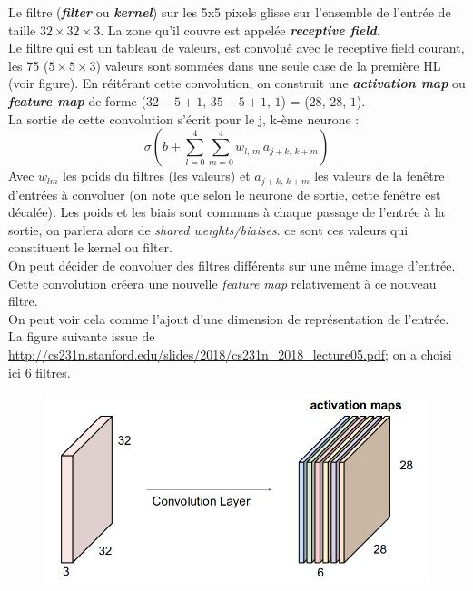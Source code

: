\documentclass[a4paper,12pt]{report}
\numberwithin{equation}{section} %
\begin{document}
Le filtre (\textit{\textbf{filter}} ou \textit{\textbf{kernel}}) sur les 5x5 pixels glisse sur l'ensemble de l'entrée de taille $32\times32\times3$. La zone qu'il couvre est appelée \textbf{\textit{receptive field}}. \\
Le filtre qui est un tableau de valeurs, est convolué avec le receptive field courant, les 75 ($5\times5\times3$) valeurs sont sommées dans une seule case de la première HL (voir figure). En réitérant cette convolution, on construit une \textit{\textbf{activation map}} ou \textit{\textbf{feature map}} de forme ($32-5+1$, $35-5+1$, $1$) = ($28$, $28$, $1$). \\
La sortie de cette convolution s'écrit pour le j, k-ème neurone :
\begin{equation*}
\sigma \left( b + \sum^4_{l=0}\sum^4_{m=0} w_{l,\,m} \, a_{j+k,\, k+m} \right)
\end{equation*}
Avec $w_{lm}$ les poids du filtres (les valeurs) et $a_{j+k,\, k+m}$ les valeurs de la fenêtre d'entrées à convoluer (on note que selon le neurone de sortie, cette fenêtre est décalée). Les poids et les biais sont communs à chaque passage de l'entrée à la sortie, on parlera alors de \textit{shared weights/biaises}. ce sont ces valeurs qui constituent le kernel ou filter.\\

On peut décider de convoluer des filtres différents sur une même image d'entrée. Cette convolution créera une nouvelle \textit{feature map} relativement à ce nouveau filtre. \\ 
On peut voir cela comme l'ajout d'une dimension de représentation de l'entrée. La figure suivante issue de \url{http://cs231n.stanford.edu/slides/2018/cs231n_2018_lecture05.pdf}; on a choisi ici 6 filtres.

\begin{figure}[!ht]
\centering
\includegraphics[scale=0.4]{conv_act_mapss.png}
\end{figure}
 
\end{document}
